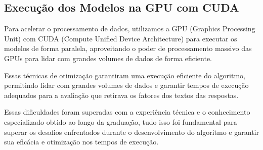 \subsection{Execução dos Modelos na GPU com CUDA}

Para acelerar o processamento de dados, utilizamos a GPU (Graphics Processing Unit) com CUDA (Compute Unified Device Architecture) para executar os modelos de forma paralela, aproveitando o poder de processamento massivo das GPUs para lidar com grandes volumes de dados de forma eficiente.

Essas técnicas de otimização garantiram uma execução eficiente do algoritmo, permitindo lidar com grandes volumes de dados e garantir tempos de execução adequados para a avaliação que retirava os fatores dos textos das respostas.

Essas dificuldades foram superadas com a experiência técnica e o conhecimento especializado obtido ao longo da graduação, tudo isso foi fundamental para superar os desafios enfrentados durante o desenvolvimento do algoritmo e garantir sua eficácia e otimização nos tempos de execução.

\newpage